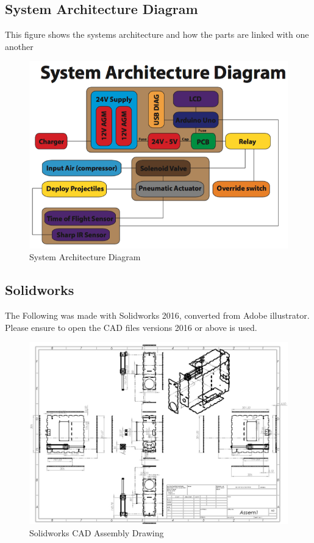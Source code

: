 \documentclass[a4paper, 10pt]{IEEEconf}
\begin{document}
\subsection{System Architecture Diagram}
This figure shows the systems architecture and how the parts are linked with one another
\begin{figure}[H]
  \includegraphics[width=\linewidth, center]{images/SAD}
  \caption{System Architecture Diagram}
  \label{fig:System Architecture Diagram}
\end{figure}

\clearpage
\subsection{Solidworks}
The Following was made with Solidworks 2016, converted from Adobe illustrator. Please ensure to open the CAD files versions 2016 or above is used.
\begin{figure}[H]
  \includegraphics[width=\linewidth, center]{images/Assembly.JPG}
  \caption{Solidworks CAD Assembly Drawing}
  \label{fig:Solidworks CAD Assembly Drawing}
\end{figure}
\end{document}
